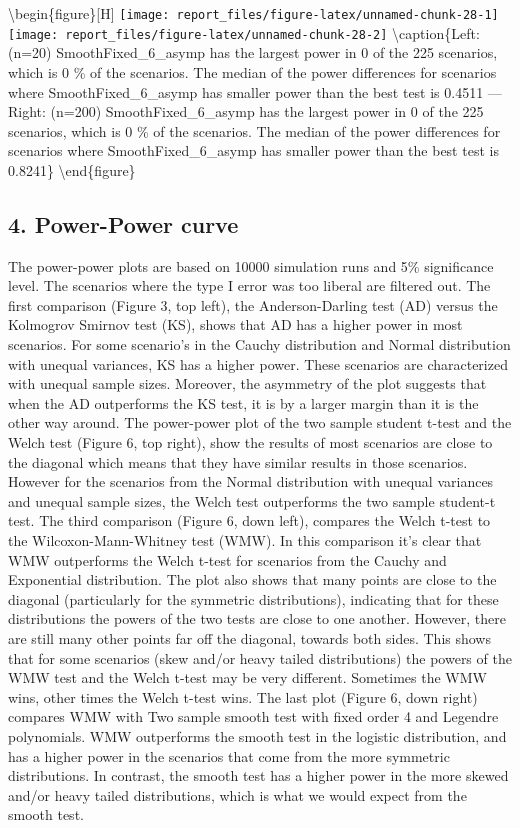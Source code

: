 \documentclass[
]{article}
\begin{document}
\textbackslash begin\{figure\}{[}H{]}
\texttt{[image: report\_files/figure-latex/unnamed-chunk-28-1]}
\texttt{[image: report\_files/figure-latex/unnamed-chunk-28-2]}
\textbackslash caption\{Left:(n=20) SmoothFixed\_6\_asymp has the
largest power in 0 of the 225 scenarios, which is 0 \% of the scenarios.
The median of the power differences for scenarios where
SmoothFixed\_6\_asymp has smaller power than the best test is 0.4511 ---
Right: (n=200) SmoothFixed\_6\_asymp has the largest power in 0 of the
225 scenarios, which is 0 \% of the scenarios. The median of the power
differences for scenarios where SmoothFixed\_6\_asymp has smaller power
than the best test is 0.8241\}\label{fig:unnamed-chunk-28}
\textbackslash end\{figure\}

\hypertarget{power-power-curve}{%
\subsection{4. Power-Power curve}\label{power-power-curve}}

The power-power plots are based on 10000 simulation runs and 5\%
significance level. The scenarios where the type I error was too liberal
are filtered out. The first comparison (Figure 3, top left), the
Anderson-Darling test (AD) versus the Kolmogrov Smirnov test (KS), shows
that AD has a higher power in most scenarios. For some scenario's in the
Cauchy distribution and Normal distribution with unequal variances, KS
has a higher power. These scenarios are characterized with unequal
sample sizes. Moreover, the asymmetry of the plot suggests that when the
AD outperforms the KS test, it is by a larger margin than it is the
other way around. The power-power plot of the two sample student t-test
and the Welch test (Figure 6, top right), show the results of most
scenarios are close to the diagonal which means that they have similar
results in those scenarios. However for the scenarios from the Normal
distribution with unequal variances and unequal sample sizes, the Welch
test outperforms the two sample student-t test. The third comparison
(Figure 6, down left), compares the Welch t-test to the
Wilcoxon-Mann-Whitney test (WMW). In this comparison it's clear that WMW
outperforms the Welch t-test for scenarios from the Cauchy and
Exponential distribution. The plot also shows that many points are close
to the diagonal (particularly for the symmetric distributions),
indicating that for these distributions the powers of the two tests are
close to one another. However, there are still many other points far off
the diagonal, towards both sides. This shows that for some scenarios
(skew and/or heavy tailed distributions) the powers of the WMW test and
the Welch t-test may be very different. Sometimes the WMW wins, other
times the Welch t-test wins. The last plot (Figure 6, down right)
compares WMW with Two sample smooth test with fixed order 4 and Legendre
polynomials. WMW outperforms the smooth test in the logistic
distribution, and has a higher power in the scenarios that come from the
more symmetric distributions. In contrast, the smooth test has a higher
power in the more skewed and/or heavy tailed distributions, which is
what we would expect from the smooth test.
\end{document}
